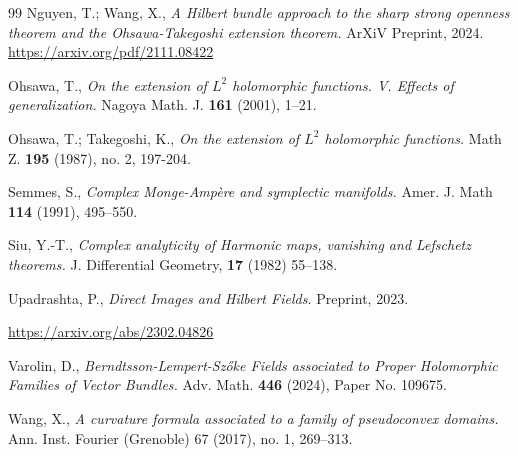\documentclass[12pt,hidelinks]{amsart}
\begin{document}
\begin{thebibliography}{99}
 Nguyen, T.; Wang, X., {\it A Hilbert bundle approach to the sharp strong openness theorem and the Ohsawa-Takegoshi extension theorem.}   ArXiV Preprint, 2024.  \url{https://arxiv.org/pdf/2111.08422}

 Ohsawa, T., {\it On the extension of  $L^2$  holomorphic functions. V. Effects of generalization.}  Nagoya Math. J. {\bf 161} (2001), 1--21.

 Ohsawa, T.; Takegoshi, K., {\it On the extension of $L^2$ holomorphic functions.}  Math Z. {\bf 195} (1987), no. 2, 197-204.

 Semmes, S., {\it Complex Monge-Amp\`ere and symplectic manifolds.}  Amer. J. Math {\bf 114} (1991), 495--550.

 Siu, Y.-T., {\it Complex analyticity of Harmonic maps, vanishing and Lefschetz theorems.}  J. Differential Geometry, {\bf 17} (1982) 55--138. 

 Upadrashta, P., {\it  Direct Images and Hilbert Fields.}  Preprint, 2023.  

\url{https://arxiv.org/abs/2302.04826}

 Varolin, D., {\it Berndtsson-Lempert-Sz\H{o}ke Fields associated to Proper Holomorphic Families of Vector Bundles.}  Adv. Math. {\bf 446} (2024), Paper No. 109675.

 Wang, X., {\it A curvature formula associated to a family of pseudoconvex domains.} Ann. Inst. Fourier (Grenoble) 67 (2017), no. 1, 269--313.

\end{thebibliography}
\end{document}
